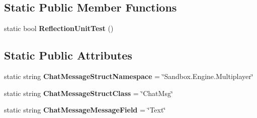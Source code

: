 \subsection*{Static Public Member Functions}
\begin{DoxyCompactItemize}
\item 
\hypertarget{class_s_e_mod_a_p_i_extensions_1_1_a_p_i_1_1_chat_manager_abefb7e02f882c9ddb843dbdadf1b3e60}{}static bool {\bfseries Reflection\+Unit\+Test} ()\label{class_s_e_mod_a_p_i_extensions_1_1_a_p_i_1_1_chat_manager_abefb7e02f882c9ddb843dbdadf1b3e60}

\end{DoxyCompactItemize}
\subsection*{Static Public Attributes}
\begin{DoxyCompactItemize}
\item 
\hypertarget{class_s_e_mod_a_p_i_extensions_1_1_a_p_i_1_1_chat_manager_aa6ad0901939df2f972dc324591e6358c}{}static string {\bfseries Chat\+Message\+Struct\+Namespace} = \char`\"{}Sandbox.\+Engine.\+Multiplayer\char`\"{}\label{class_s_e_mod_a_p_i_extensions_1_1_a_p_i_1_1_chat_manager_aa6ad0901939df2f972dc324591e6358c}

\item 
\hypertarget{class_s_e_mod_a_p_i_extensions_1_1_a_p_i_1_1_chat_manager_ab3db9f7af8261901aab6da7e070bfe83}{}static string {\bfseries Chat\+Message\+Struct\+Class} = \char`\"{}Chat\+Msg\char`\"{}\label{class_s_e_mod_a_p_i_extensions_1_1_a_p_i_1_1_chat_manager_ab3db9f7af8261901aab6da7e070bfe83}

\item 
\hypertarget{class_s_e_mod_a_p_i_extensions_1_1_a_p_i_1_1_chat_manager_a429e7f19cb602c42f1acbe46ec9ae531}{}static string {\bfseries Chat\+Message\+Message\+Field} = \char`\"{}Text\char`\"{}\label{class_s_e_mod_a_p_i_extensions_1_1_a_p_i_1_1_chat_manager_a429e7f19cb602c42f1acbe46ec9ae531}

\end{DoxyCompactItemize}
